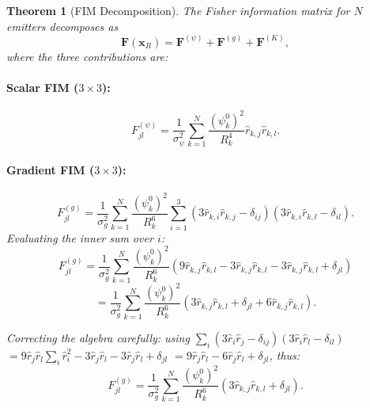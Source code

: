 \documentclass[twocolumn,superscriptaddress,prd,nofootinbib]{revtex4-2}
\newcommand{\FIM}{\mathbf{F}}
\newcommand{\xvec}{\mathbf{x}}
\newtheorem{theorem}{Theorem}
\begin{document}
\begin{theorem}[FIM Decomposition]\label{thm:fim}
The Fisher information matrix for $N$ emitters decomposes as
\begin{equation}
\boxed{
\FIM(\xvec_R) = \FIM^{(\psi)} + \FIM^{(g)} + \FIM^{(K)},
}
\label{eq:fim-decomp}
\end{equation}
where the three contributions are:

\paragraph{Scalar FIM ($3\times 3$):}
\begin{equation}
F_{jl}^{(\psi)} = \frac{1}{\sigma_\psi^2}\sum_{k=1}^N
\frac{(\psi_k^0)^2}{R_k^4}\hat{r}_{k,j}\hat{r}_{k,l}.
\label{eq:Fpsi}
\end{equation}

\paragraph{Gradient FIM ($3\times 3$):}
\begin{equation}
F_{jl}^{(g)} = \frac{1}{\sigma_g^2}\sum_{k=1}^N
\frac{(\psi_k^0)^2}{R_k^6}\sum_{i=1}^3
(3\hat{r}_{k,i}\hat{r}_{k,j} - \delta_{ij})
(3\hat{r}_{k,i}\hat{r}_{k,l} - \delta_{il}).
\label{eq:Fgrad}
\end{equation}
Evaluating the inner sum over $i$:
\begin{equation}
F_{jl}^{(g)} = \frac{1}{\sigma_g^2}\sum_{k=1}^N
\frac{(\psi_k^0)^2}{R_k^6}
(9\hat{r}_{k,j}\hat{r}_{k,l} - 3\hat{r}_{k,j}\hat{r}_{k,l}
- 3\hat{r}_{k,j}\hat{r}_{k,l} + \delta_{jl})
\end{equation}
\begin{equation}
= \frac{1}{\sigma_g^2}\sum_{k=1}^N
\frac{(\psi_k^0)^2}{R_k^6}
(3\hat{r}_{k,j}\hat{r}_{k,l} + \delta_{jl}
+ 6\hat{r}_{k,j}\hat{r}_{k,l}).
\end{equation}

Correcting the algebra carefully: using
$\sum_i (3\hat{r}_i\hat{r}_j - \delta_{ij})(3\hat{r}_i\hat{r}_l - \delta_{il})$
$= 9\hat{r}_j\hat{r}_l\sum_i \hat{r}_i^2
- 3\hat{r}_j\hat{r}_l - 3\hat{r}_j\hat{r}_l + \delta_{jl}$
$= 9\hat{r}_j\hat{r}_l - 6\hat{r}_j\hat{r}_l + \delta_{jl}$, thus:
\begin{equation}
\boxed{
F_{jl}^{(g)} = \frac{1}{\sigma_g^2}\sum_{k=1}^N
\frac{(\psi_k^0)^2}{R_k^6}
(3\hat{r}_{k,j}\hat{r}_{k,l} + \delta_{jl}).
}
\label{eq:Fgrad-final}
\end{equation}


\end{theorem}
\end{document}
